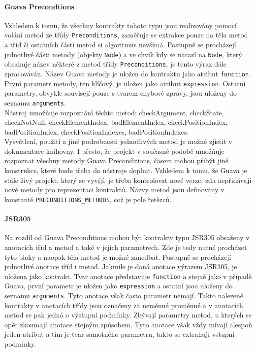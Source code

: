 			\paragraph{Guava Precondtions}
				Vzhledem k tomu, že všechny kontrakty tohoto typu jsou realizovány pomocí volání metod ze třídy \texttt{Preconditions}, zaměřuje se extrakce pouze na těla metod a tříd či ostatních částí metod si algoritmus nevšímá. Postupně se procházejí jednotlivé části metody (objekty \texttt{Node}) a ve chvíli kdy se narazí na \texttt{Node}, který obsahuje název některé z metod třídy \texttt{Preconditions}, je tento výraz dále zpracováván. Název Guava metody je uložen do kontraktu jako atribut \texttt{function}. První parametr metody, ten klíčový, je uložen jako atribut \texttt{expression}. Ostatní parametry, obvykle souvisejí pouze s tvarem chybové zprávy, jsou uloženy do seznamu \texttt{arguments}.\\				
				
				Nástroj umožňuje rozpoznání těchto metod: checkArgument, checkState, checkNotNull, checkElementIndex, badElementIndex, checkPositionIndex, badPositionIndex, checkPositionIndexes, badPositionIndexes.\\
				
				Vysvětlení, použití a jiné podrobnosti jednotlivých metod je možné zjistit v dokumentace knihovny. I přesto, že projekt v současné podobě umožňuje rozpoznat všechny metody Guava Preconditions, časem mohou přibýt jiné konstrukce, které bude třeba do nástroje doplnit. Vzhledem k tomu, že Guava je stále živý projekt, který se vyvíjí, je třeba kontrolovat nové verze, zda nepřidávají nové metody pro reprezentaci kontraktů.	Názvy metod jsou definovány v konstantě \texttt{PRECONDITIONS\_METHODS}, což je pole řetězců.
				
			\paragraph{JSR305}
				Na rozdíl od Guava Preconditions mohou být kontrakty typu JSR305 obsaženy v anotacích tříd a metod a také v jejich parametrech. Zde je tedy nutné procházet tyto bloky a naopak těla metod je možné zanedbat. Postupně se procházejí jednotlivé anotace tříd i metod. Jakmile je daná anotace výrazem JSR305, je uložena jako kontrakt. Tvar anotace představuje \texttt{function} a stejně jako v případě Guava, první parametr je uložen jako \texttt{expression} a ostatní jsou uloženy do seznamu \texttt{arguments}. Tyto anotace však často parametr nemají. Takto nalezené kontrakty v anotacích třídy jsou označeny za neměnné proměnné a v anotacích metod se pak jedná o výstupní podmínky. Zbývají parametry metod, u kterých se opět zkoumají anotace stejným způsobem. Tyto anotace však vždy mívají alespoň jeden atribut a tím je tvar samotného parametru, takto se extrahují vstupní podmínky.\\			

